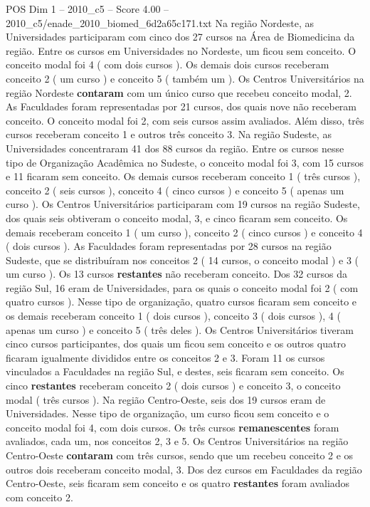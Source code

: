 \begin{textsample}{POS Dim 1 – 2010\_c5 – Score 4.00 – 2010\_c5/enade\_2010\_biomed\_6d2a65c171.txt}
Na região Nordeste, as Universidades participaram com cinco dos 27 cursos na Área de Biomedicina da região.
Entre os cursos em Universidades no Nordeste, um ficou sem conceito.
O conceito modal foi 4 ( com dois cursos ).
Os demais dois cursos receberam conceito 2 ( um curso ) e conceito 5 ( também um ).
Os Centros Universitários na região Nordeste \textbf{contaram} com um único curso que recebeu conceito modal, 2.
As Faculdades foram representadas por 21 cursos, dos quais nove não receberam conceito.
O conceito modal foi 2, com seis cursos assim avaliados.
Além disso, três cursos receberam conceito 1 e outros três conceito 3.
Na região Sudeste, as Universidades concentraram 41 dos 88 cursos da região.
Entre os cursos nesse tipo de Organização Acadêmica no Sudeste, o conceito modal foi 3, com 15 cursos e 11 ficaram sem conceito.
Os demais cursos receberam conceito 1 ( três cursos ), conceito 2 ( seis cursos ), conceito 4 ( cinco cursos ) e conceito 5 ( apenas um curso ).
Os Centros Universitários participaram com 19 cursos na região Sudeste, dos quais seis obtiveram o conceito modal, 3, e cinco ficaram sem conceito.
Os demais receberam conceito 1 ( um curso ), conceito 2 ( cinco cursos ) e conceito 4 ( dois cursos ).
As Faculdades foram representadas por 28 cursos na região Sudeste, que se distribuíram nos conceitos 2 ( 14 cursos, o conceito modal ) e 3 ( um curso ).
Os 13 cursos \textbf{restantes} não receberam conceito.
Dos 32 cursos da região Sul, 16 eram de Universidades, para os quais o conceito modal foi 2 ( com quatro cursos ).
Nesse tipo de organização, quatro cursos ficaram sem conceito e os demais receberam conceito 1 ( dois cursos ), conceito 3 ( dois cursos ), 4 ( apenas um curso ) e conceito 5 ( três deles ).
Os Centros Universitários tiveram cinco cursos participantes, dos quais um ficou sem conceito e os outros quatro ficaram igualmente divididos entre os conceitos 2 e 3.
Foram 11 os cursos vinculados a Faculdades na região Sul, e destes, seis ficaram sem conceito.
Os cinco \textbf{restantes} receberam conceito 2 ( dois cursos ) e conceito 3, o conceito modal ( três cursos ).
Na região Centro-Oeste, seis dos 19 cursos eram de Universidades.
Nesse tipo de organização, um curso ficou sem conceito e o conceito modal foi 4, com dois cursos.
Os três cursos \textbf{remanescentes} foram avaliados, cada um, nos conceitos 2, 3 e 5.
Os Centros Universitários na região Centro-Oeste \textbf{contaram} com três cursos, sendo que um recebeu conceito 2 e os outros dois receberam conceito modal, 3.
Dos dez cursos em Faculdades da região Centro-Oeste, seis ficaram sem conceito e os quatro \textbf{restantes} foram avaliados com conceito 2.

\end{textsample}
